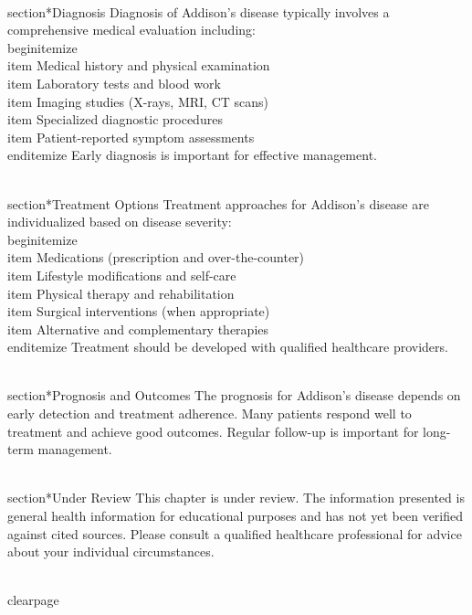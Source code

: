 \\section*{Diagnosis}
Diagnosis of Addison's disease typically involves a comprehensive medical evaluation including:
\\begin{itemize}
  \\item Medical history and physical examination
  \\item Laboratory tests and blood work
  \\item Imaging studies (X-rays, MRI, CT scans)
  \\item Specialized diagnostic procedures
  \\item Patient-reported symptom assessments
\\end{itemize}
Early diagnosis is important for effective management.

\\section*{Treatment Options}
Treatment approaches for Addison's disease are individualized based on disease severity:
\\begin{itemize}
  \\item Medications (prescription and over-the-counter)
  \\item Lifestyle modifications and self-care
  \\item Physical therapy and rehabilitation
  \\item Surgical interventions (when appropriate)
  \\item Alternative and complementary therapies
\\end{itemize}
Treatment should be developed with qualified healthcare providers.

\\section*{Prognosis and Outcomes}
The prognosis for Addison's disease depends on early detection and treatment adherence. Many patients respond well to treatment and achieve good outcomes. Regular follow-up is important for long-term management.

\\section*{Under Review}
This chapter is under review. The information presented is general health information for educational purposes and has not yet been verified against cited sources. Please consult a qualified healthcare professional for advice about your individual circumstances.

\\clearpage
